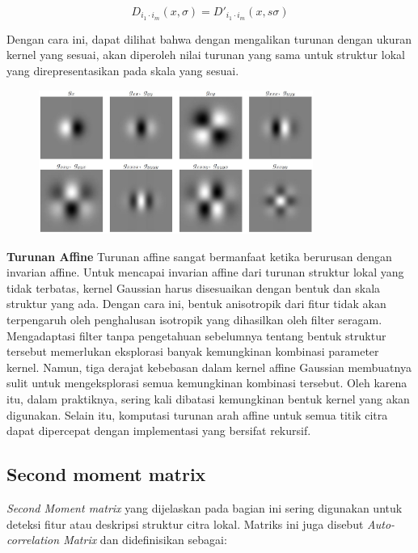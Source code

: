 \begin{equation*}
  D_{i_{1}\cdot i_{m}}(x,\sigma) = D'_{i_{1}\cdot i_{m}}(x,s\sigma)
\end{equation*}

Dengan cara ini, dapat dilihat bahwa dengan mengalikan turunan dengan ukuran kernel yang sesuai, akan diperoleh nilai turunan yang sama untuk struktur lokal yang direpresentasikan pada skala yang sesuai.

\begin{figure}
  \centering{}
  \includegraphics[width=0.8\textwidth]{gambar/Uniform Gaussian derivatives.jpg}
  \caption{}
\end{figure}

\textbf{Turunan Affine} Turunan affine sangat bermanfaat ketika berurusan dengan invarian affine. Untuk mencapai invarian affine dari turunan struktur lokal yang tidak terbatas, kernel Gaussian harus disesuaikan dengan bentuk dan skala struktur yang ada. Dengan cara ini, bentuk anisotropik dari fitur tidak akan terpengaruh oleh penghalusan isotropik yang dihasilkan oleh filter seragam. Mengadaptasi filter tanpa pengetahuan sebelumnya tentang bentuk struktur tersebut memerlukan eksplorasi banyak kemungkinan kombinasi parameter kernel. Namun, tiga derajat kebebasan dalam kernel affine Gaussian membuatnya sulit untuk mengeksplorasi semua kemungkinan kombinasi tersebut. Oleh karena itu, dalam praktiknya, sering kali dibatasi kemungkinan bentuk kernel yang akan digunakan. Selain itu, komputasi turunan arah affine untuk semua titik citra dapat dipercepat dengan implementasi yang bersifat rekursif.

\subsection{Second moment matrix}
\label{subsex:SMM}

\emph{Second Moment matrix} yang dijelaskan pada bagian ini sering digunakan untuk deteksi fitur atau deskripsi struktur citra lokal. Matriks ini juga disebut \emph{Auto-correlation Matrix} dan didefinisikan sebagai:

